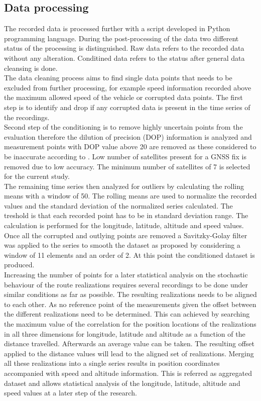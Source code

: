 \documentclass{article}
\begin{document}
		\subsection{Data processing}
			The recorded data is processed further with a script developed in Python programming language. During the post-processing of the data two different status of the processing is distinguished. Raw data refers to the recorded data without any alteration. Conditined data refers to the status after general data cleansing is done. \\
			The data cleaning process aims to find single data points that needs to be excluded from further processing, for example speed information recorded above the maximum allowed speed of the vehicle or corrupted data points. The first step is to identify and drop if any corrupted data is present in the time series of the recordings. \\
			Second step of the conditioning is to remove highly uncertain points from the evaluation therefore the dilution of precision (DOP) information is analyzed and measurement points with DOP value above 20 are removed as these considered to be inaccurate according to \cite{tahsinAnalysisDOPIts2015}. Low number of satellites present for a GNSS fix is removed due to low accuracy. The minimum number of satellites of 7 is selected for the current study. \\
			The remaining time series then analyzed for outliers by calculating the rolling means with a window of 50. The rolling means are used to normalize the recorded values and the standard deviation of the normalized series calculated. The treshold is that each recorded point has to be in  standard deviation range. The calculation is performed for the longitude, latitude, altitude and speed values. Once all the corrupted and outlying points are removed a Savitzky-Golay filter was applied to the series to smooth the dataset as proposed by \cite{wilkDigitalFilteringRailway2020} considering a window of 11 elements and an order of 2. At this point the conditioned dataset is produced. \\
			Increasing the number of points for a later statistical analysis on the stochastic behaviour of the route realizations requires several recordings to be done under similar conditions as far as possible. The resulting realizations needs to be aligned to each other. As no reference point of the measurements given the offset between the different realizations need to be determined. This can achieved by searching the maximum value of the correlation for the position locations of the realizations in all three dimensions for longitude, latitude and altitude as a function of the distance travelled. Afterwards an average value can be taken. The resulting offset applied to the distance values will lead to the aligned set of realizations. Merging all these realizations into a single series results in position coordinates accompanied with speed and altitude information. This is referred as aggregated dataset and allows statistical analysis of the longitude, latitude, altitude and speed values at a later step of the research.		
\end{document}
